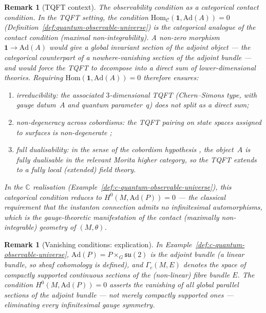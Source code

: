 \documentclass[12pt,a4paper]{report}
\newtheorem{remark}[theorem]{Remark}
\begin{document}
\begin{remark}[TQFT context]
\medskip\noindent\textit{The observability condition as a categorical
contact condition.}\;
In the TQFT setting, the condition
$\mathrm{Hom}_{\mathcal{C}}(\mathbf{1}, \mathrm{Ad}(A)) = 0$
(Definition~\ref{def:quantum-observable-universe}) is the categorical
analogue of the \emph{contact condition} (maximal non-integrability).
A non-zero morphism $\mathbf{1} \to \mathrm{Ad}(A)$ would give a
global invariant section of the adjoint object --- the categorical
counterpart of a nowhere-vanishing section of the adjoint bundle --- and
would force the TQFT to decompose into a direct sum of
lower-dimensional theories.  Requiring
$\mathrm{Hom}(\mathbf{1}, \mathrm{Ad}(A)) = 0$ therefore ensures:
\begin{enumerate}
  \item \emph{irreducibility}: the associated $3$-dimensional TQFT
        (Chern--Simons type, with gauge datum~$A$ and quantum
        parameter~$q$) does not split as a direct sum;
  \item \emph{non-degeneracy across cobordisms}: the TQFT pairing on
        state spaces assigned to surfaces is non-degenerate
        \cite{freed2010};
  \item \emph{full dualisability}: in the sense of the cobordism
        hypothesis \cite{baez1995, lurie2009}, the object~$A$ is
        fully dualisable in the relevant Morita higher category, so the
        TQFT extends to a fully local (extended) field theory.
\end{enumerate}
In the $\mathbb{C}$ realisation
(Example~\ref{def:c-quantum-observable-universe}), this categorical
condition reduces to
$H^0(M, \mathrm{Ad}(P)) = 0$ --- the classical requirement that the
instanton connection admits no infinitesimal automorphisms, which is the
gauge-theoretic manifestation of the contact (maximally non-integrable)
geometry of $(M, \theta)$.
\end{remark}

\begin{remark}[Vanishing conditions: explication]
\label{rem:vanishing-explication}
In Example~\ref{def:c-quantum-observable-universe},
$\mathrm{Ad}(P) = P \times_G \mathfrak{su}(2)$ is the adjoint bundle
(a linear bundle, so sheaf cohomology is defined), and $\Gamma_c(M,E)$
denotes the space of compactly supported continuous sections of the
(non-linear) fibre bundle $E$.  The condition $H^0(M, \mathrm{Ad}(P)) = 0$
asserts the vanishing of \emph{all} global parallel sections of the adjoint
bundle --- not merely compactly supported ones --- eliminating every
infinitesimal gauge symmetry.
\end{remark}
\end{document}
